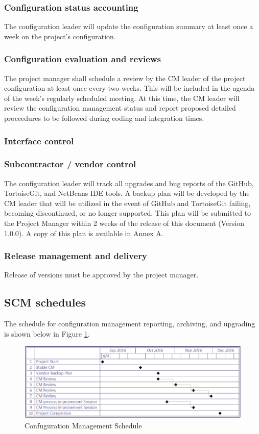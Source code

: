 \documentclass{scrartcl}
\begin{document}
\subsubsection{Configuration status accounting}
The configuration leader will update the configuration summary at least once a week on the project's configuration.
\subsubsection{Configuration evaluation and reviews}
The project manager shall schedule a review by the CM leader of the project configuration at least once every two weeks.  This will be included in the agenda of the week's regularly scheduled meeting.  At this time, the CM leader will review the configuration management status and report proposed detailed proceedures to be followed during coding and integration times.
\subsubsection{Interface control}

\subsubsection{Subcontractor / vendor control}
The configuration leader will track all upgrades and bug reports of the GitHub, TortoiseGit, and NetBeans IDE tools.  A backup plan will be developed by the CM leader that will be utilized in the event of GitHub and TortoiseGit failing, becoming discontinued, or no longer supported.  This plan will be submitted to the Project Manager within 2 weeks of the release of this document (Version 1.0.0).  A copy of this plan is available in Annex A.
\subsubsection{Release management and delivery}
Release of versions must be approved by the project manager.

\subsection{SCM schedules}
The schedule for configuration management reporting, archiving, and upgrading is shown below in Figure \ref{fig:schedule}.
\begin{figure}[H]
\centering
\includegraphics[scale=0.65]{CMSchedule}
 \caption{Confuguration Management Schedule}
 \label{fig:schedule}
\end{figure}
\end{document}

